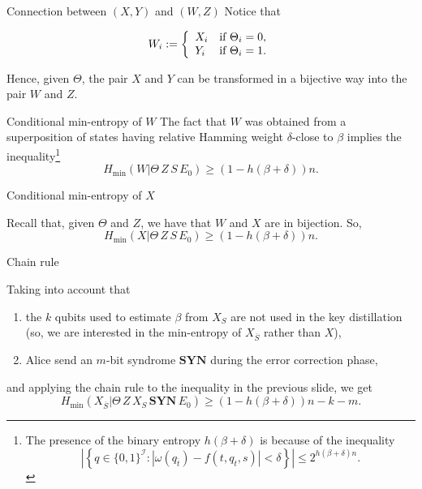 \documentclass{beamer}
\begin{document}
\begin{frame}{Connection between $(X,Y)$ and $(W, Z)$}
Notice that

$$
W_i := \left\{\begin{array}{l l} X_i & \text{if } \Theta_i = 0, \\
Y_i & \text{if } \Theta_i = 1.
 \end{array} \right.
$$

Hence, given $\Theta$, the pair $X$ and $Y$ can be transformed in a bijective way into the pair $W$ and $Z$.
\end{frame}


\begin{frame}{Conditional min-entropy of $W$}
The fact that $W$ was obtained from a superposition of states having relative Hamming weight $\delta$-close to $\beta$ implies the inequality\footnote{The presence of the binary entropy $h(\beta + \delta)$ is because of the inequality
$$
\left| \left\{ q\in\{0,1\}^{\mathcal{I}} : \left| \omega(q_{\overline{t}}) - f(t, q_t, s) \right| < \delta \right\}\right| \leq 2^{h(\beta + \delta) n}.
$$}
$$
H_{\min}(W|\Theta \, Z \, S \, E_0) \geq \left(1 - h(\beta + \delta) \right) n.
$$
\end{frame}

\begin{frame}{Conditional min-entropy of $X$}

Recall that, given $\Theta$ and $Z$, we have that $W$ and $X$ are in bijection. So,
$$
H_{\min}(X|\Theta \, Z \, S \, E_0) \geq \left(1 - h(\beta + \delta) \right) n.
$$
\end{frame}


\begin{frame}{Chain rule}

Taking into account that

\begin{enumerate}[label=(\roman*)]
\item the $k$ qubits used to estimate $\beta$ from $X_S$ are not used in the key distillation (so, we are interested in the min-entropy of $X_{\overline{S}}$ rather than $X$),
\item Alice send an $m$-bit syndrome $\textbf{SYN}$ during the error correction phase,
\end{enumerate}
and applying the chain rule to the inequality in the previous slide, we get
$$
H_{\min}(X_{\overline{S}}|\Theta \, Z \, X_S \, \textbf{SYN} \, E_0) \geq \left(1 - h(\beta + \delta) \right) n - k - m.
$$
\end{frame}
\end{document}
